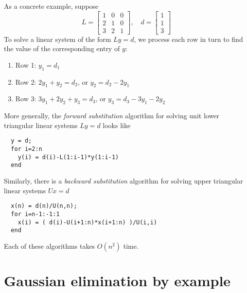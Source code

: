 \documentclass[12pt, leqno]{article}
\begin{document}
As a concrete example, suppose
\[
  L = \begin{bmatrix}
        1 & 0 & 0 \\
        2 & 1 & 0 \\
        3 & 2 & 1
      \end{bmatrix}, \quad
  d = \begin{bmatrix} 1 \\ 1 \\ 3 \end{bmatrix}
\]
To solve a linear system of the form $Ly = d$, we process each row in
turn to find the value of the corresponding entry of $y$:
\begin{enumerate}
\item Row 1:
  $y_1 = d_1$
\item Row 2: $2y_1 + y_2 = d_2$, or $y_2 = d_2 - 2y_1$
\item Row 3: $3y_1 + 2 y_2 + y_3 = d_3$, or $y_3 = d_3 - 3y_1 - 2y_2$
\end{enumerate}
More generally, the {\em forward substitution} algorithm for solving
unit lower triangular linear systems $Ly = d$ looks like
\begin{lstlisting}
  y = d;
  for i=2:n
    y(i) = d(i)-L(1:i-1)*y(1:i-1)
  end
\end{lstlisting}
Similarly, there is a {\em backward substitution} algorithm for
solving upper triangular linear systems $Ux = d$
\begin{lstlisting}
  x(n) = d(n)/U(n,n);
  for i=n-1:-1:1
    x(i) = ( d(i)-U(i+1:n)*x(i+1:n) )/U(i,i)
  end
\end{lstlisting}
Each of these algorithms takes $O(n^2)$ time.

\section{Gaussian elimination by example}
\end{document}
